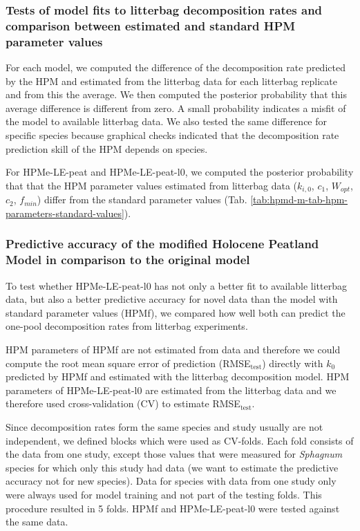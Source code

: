 \documentclass[
  12pt,
]{article}
\begin{document}
\hypertarget{sdm-003-methods-9}{%
\subsubsection{Tests of model fits to litterbag decomposition rates and comparison between estimated and standard HPM parameter values}\label{sdm-003-methods-9}}

For each model, we computed the difference of the decomposition rate predicted by the HPM and estimated from the litterbag data for each litterbag replicate and from this the average. We then computed the posterior probability that this average difference is different from zero. A small probability indicates a misfit of the model to available litterbag data. We also tested the same difference for specific species because graphical checks indicated that the decomposition rate prediction skill of the HPM depends on species.

For HPMe-LE-peat and HPMe-LE-peat-l0, we computed the posterior probability that that the HPM parameter values estimated from litterbag data (\(k_{i,0}\), \(c_1\), \(W_{opt}\), \(c_2\), \(f_{min}\)) differ from the standard parameter values (Tab. \ref{tab:hpmd-m-tab-hpm-parameters-standard-values}).

\hypertarget{sdm-003-methods-11}{%
\subsubsection{Predictive accuracy of the modified Holocene Peatland Model in comparison to the original model}\label{sdm-003-methods-11}}

To test whether HPMe-LE-peat-l0 has not only a better fit to available litterbag data, but also a better predictive accuracy for novel data than the model with standard parameter values (HPMf), we compared how well both can predict the one-pool decomposition rates from litterbag experiments.

HPM parameters of HPMf are not estimated from data and therefore we could compute the root mean square error of prediction (RMSE\(_\text{test}\)) directly with \(k_0\) predicted by HPMf and estimated with the litterbag decomposition model. HPM parameters of HPMe-LE-peat-l0 are estimated from the litterbag data and we therefore used cross-validation (CV) to estimate RMSE\(_\text{test}\).

Since decomposition rates form the same species and study usually are not independent, we defined blocks which were used as CV-folds. Each fold consists of the data from one study, except those values that were measured for \emph{Sphagnum} species for which only this study had data (we want to estimate the predictive accuracy not for new species). Data for species with data from one study only were always used for model training and not part of the testing folds. This procedure resulted in 5 folds. HPMf and HPMe-LE-peat-l0 were tested against the same data.
\end{document}
